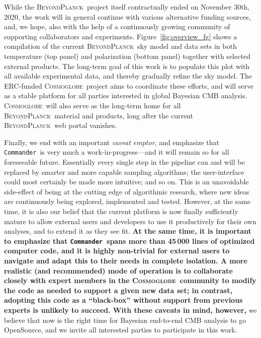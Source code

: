 \documentclass[twocolumn]{aa}
\def\commander{\texttt{Commander}}
\newcommand{\BP}{\textsc{BeyondPlanck}}
\newcommand{\cosmoglobe}{\textsc{Cosmoglobe}}
\begin{document}
While the \BP\ project itself contractually ended on November 30th,
2020, the work will in general continue with various alternative
funding sources, and, we hope, also with the help of a continuously
growing community of supporting collaborators and
experiments. Figure~\ref{fig:overview_fg} shows a compilation of the
current \BP\ sky model and data sets in both temperature (top panel)
and polarization (bottom panel) together with selected external
products. The long-term goal of this work is to populate this plot
with all available experimental data, and thereby gradually refine the
sky model. The ERC-funded \cosmoglobe\ project aims to coordinate
these efforts, and will serve as a stable platform for all parties
interested in global Bayesian CMB analysis. \cosmoglobe\ will also
serve as the long-term home for all \BP\ material and products, long
after the current \BP\ web portal vanishes.

Finally, we end with an important \emph{caveat emptor}, and emphasize
that \commander\ is very much a work-in-progress---and it will remain
so for all foreseeable future. Essentially every single step in the
pipeline can and will be replaced by smarter and more capable sampling
algorithms; the user-interface could most certainly be made more
intuitive; and so on. This is an unavoidable side-effect of being at
the cutting edge of algorithmic research, where new ideas are
continuously being explored, implemented and tested. However, at the
same time, it is also our belief that the current platform is now
finally sufficiently mature to allow external users and developers to
use it productively for their own analyses, and to extend it as they
see fit. {\bf At the same time, it is important to emphasize that
  \commander\ spans more than 45\,000 lines of optimized computer
  code, and it is highly non-trivial for external users to navigate and adapt
  this to their needs in complete isolation. A more realistic (and
  recommended) mode of operation is to collaborate closely with expert
  members in the \cosmoglobe\ community to modify the code as needed
  to support a given new data set; in contrast, adopting this code as
  a ``black-box'' without support from previous experts is unlikely to
  succeed. With these caveats in mind, however,} we believe that now
is the right time for Bayesian end-to-end CMB analysis to go
OpenSource, and we invite all interested parties to participate in
this work.




\end{document}
